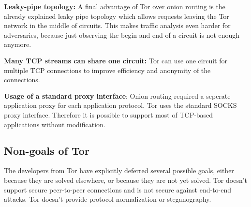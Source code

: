 \textbf{Leaky-pipe topology:} A final advantage of Tor over onion routing is the already explained leaky pipe topology which allows requests leaving the Tor network in the middle of circuits. This makes traffic analysis even harder for adversaries, because just observing the begin and end of a circuit is not enough anymore.

\textbf{Many TCP streams can share one circuit: } Tor can use one circuit for multiple TCP connections to improve efficiency and anonymity of the connections.

\textbf{Usage of a standard proxy interface}: Onion routing required a seperate application proxy for each application protocol. Tor uses the standard SOCKS proxy interface. Therefore it is possible to support most of TCP-based applications without modification.

\subsection{Non-goals of Tor}
The developers from Tor have explicitly deferred several possible goals, either because they are solved elsewhere, or because they are not yet solved. Tor doesn't support secure peer-to-peer connections and is not secure against end-to-end attacks. Tor doesn't provide protocol normalization or steganography.